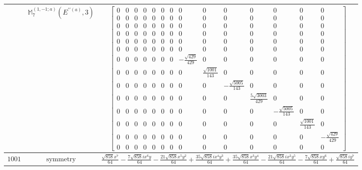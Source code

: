 \documentclass[fleqn,8pt,landscape]{jsarticle}
\begin{document}
\begin{longtable}{ccc}
$  $ & $ \mathbb{M}_{7}^{(1,-1;a)}(E^{\prime\prime(a)},3) $ & $ \begin{bmatrix} 0 & 0 & 0 & 0 & 0 & 0 & 0 & 0 & 0 & 0 & 0 & 0 & 0 & 0 \\ 0 & 0 & 0 & 0 & 0 & 0 & 0 & 0 & 0 & 0 & 0 & 0 & 0 & 0 \\ 0 & 0 & 0 & 0 & 0 & 0 & 0 & 0 & 0 & 0 & 0 & 0 & 0 & 0 \\ 0 & 0 & 0 & 0 & 0 & 0 & 0 & 0 & 0 & 0 & 0 & 0 & 0 & 0 \\ 0 & 0 & 0 & 0 & 0 & 0 & 0 & 0 & 0 & 0 & 0 & 0 & 0 & 0 \\ 0 & 0 & 0 & 0 & 0 & 0 & 0 & 0 & 0 & 0 & 0 & 0 & 0 & 0 \\ 0 & 0 & 0 & 0 & 0 & 0 & 0 & - \frac{\sqrt{429}}{429} & 0 & 0 & 0 & 0 & 0 & 0 \\ 0 & 0 & 0 & 0 & 0 & 0 & 0 & 0 & \frac{\sqrt{1001}}{143} & 0 & 0 & 0 & 0 & 0 \\ 0 & 0 & 0 & 0 & 0 & 0 & 0 & 0 & 0 & - \frac{\sqrt{5005}}{143} & 0 & 0 & 0 & 0 \\ 0 & 0 & 0 & 0 & 0 & 0 & 0 & 0 & 0 & 0 & \frac{5 \sqrt{3003}}{429} & 0 & 0 & 0 \\ 0 & 0 & 0 & 0 & 0 & 0 & 0 & 0 & 0 & 0 & 0 & - \frac{\sqrt{5005}}{143} & 0 & 0 \\ 0 & 0 & 0 & 0 & 0 & 0 & 0 & 0 & 0 & 0 & 0 & 0 & \frac{\sqrt{1001}}{143} & 0 \\ 0 & 0 & 0 & 0 & 0 & 0 & 0 & 0 & 0 & 0 & 0 & 0 & 0 & - \frac{\sqrt{429}}{429} \\ 0 & 0 & 0 & 0 & 0 & 0 & 0 & 0 & 0 & 0 & 0 & 0 & 0 & 0 \end{bmatrix} $ \\ \hline
$ 1001 $ & $ \text{symmetry} $ & $ \frac{\sqrt{858} x^{7}}{64} - \frac{7 \sqrt{858} i x^{6} y}{64} - \frac{21 \sqrt{858} x^{5} y^{2}}{64} + \frac{35 \sqrt{858} i x^{4} y^{3}}{64} + \frac{35 \sqrt{858} x^{3} y^{4}}{64} - \frac{21 \sqrt{858} i x^{2} y^{5}}{64} - \frac{7 \sqrt{858} x y^{6}}{64} + \frac{\sqrt{858} i y^{7}}{64} $ \\

\end{longtable}
\end{document}
